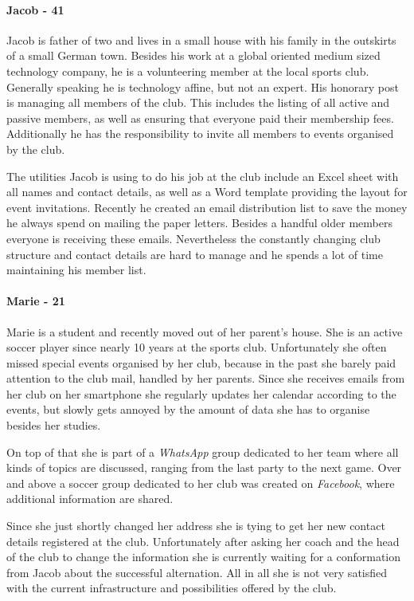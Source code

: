 \paragraph{Jacob - 41}
\label{sec:Jacob}

Jacob is father of two and lives in a small house with his family in the outskirts of a small German town. Besides his work at a global oriented medium sized technology company, he is a volunteering member at the local sports club. Generally speaking he is technology affine, but not an expert. His honorary post is managing all members of the club. This includes the listing of all active and passive members, as well as ensuring that everyone paid their membership fees. Additionally he has the responsibility to invite all members to events organised by the club. 

The utilities Jacob is using to do his job at the club include an Excel sheet with all names and contact details, as well as a Word template providing the layout for event invitations. Recently he created an email distribution list to save the money he always spend on mailing the paper letters. Besides a handful older members everyone is receiving these emails. Nevertheless the constantly changing club structure and contact details are hard to manage and he spends a lot of time maintaining his member list.

\paragraph{Marie - 21}
\label{sec:Marie}
Marie is a student and recently moved out of her parent's house. She is an active soccer player since nearly 10 years at the sports club. Unfortunately she often missed special events organised by her club, because in the past she barely paid attention to the club mail, handled by her parents. Since she receives emails from her club on her smartphone she regularly updates her calendar according to the events, but slowly gets annoyed by the amount of data she has to organise besides her studies.

On top of that she is part of a \emph{WhatsApp} group dedicated to her team where all kinds of topics are discussed, ranging from the last party to the next game. Over and above a soccer group dedicated to her club was created on \emph{Facebook}, where additional information are shared.

Since she just shortly changed her address she is tying to get her new contact details registered at the club. Unfortunately after asking her coach and the head of the club to change the information she is currently waiting for a conformation from Jacob about the successful alternation. All in all she is not very satisfied with the current infrastructure and possibilities offered by the club.

